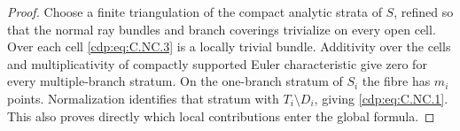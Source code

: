 \begin{proof}
Choose a finite triangulation of the compact analytic strata of $S$, refined so that the normal ray bundles and branch coverings trivialize on every open cell. Over each cell \eqref{cdp:eq:C.NC.3} is a locally trivial bundle. Additivity over the cells and multiplicativity of compactly supported Euler characteristic give zero for every multiple-branch stratum. On the one-branch stratum of $S_i$ the fibre has $m_i$ points. Normalization identifies that stratum with $T_i\setminus D_i$, giving \eqref{cdp:eq:C.NC.1}. This also proves directly which local contributions enter the global formula.
\end{proof}


